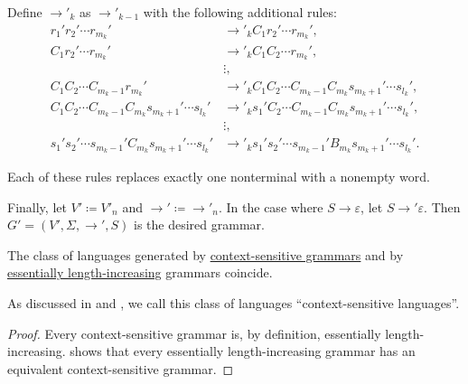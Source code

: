 \begin{algorithm}
\begin{thmenum}
    Define \( \to'_k \) as \( \to'_{k-1} \) with the following additional rules:
    \begin{align*}
      r_1' r_2' \cdots r_{m_k}'                                      &\to'_k C_1 r_2' \cdots r_{m_k}', \\
      C_1 r_2' \cdots r_{m_k}'                                       &\to'_k C_1 C_2 \cdots r_{m_k}', \\
                                                                     &\vdots, \\
      C_1 C_2 \cdots C_{m_k-1} r_{m_k}'                              &\to'_k C_1 C_2 \cdots C_{m_k-1} C_{m_k} s_{m_k+1}' \cdots s_{l_k}', \\
      C_1 C_2 \cdots C_{m_k-1} C_{m_k} s_{m_k+1}' \cdots s_{l_k}'    &\to'_k s_1' C_2 \cdots C_{m_k-1} C_{m_k} s_{m_k+1}' \cdots s_{l_k}', \\
                                                                     &\vdots, \\
      s_1' s_2' \cdots s_{m_k-1}' C_{m_k} s_{m_k+1}' \cdots s_{l_k}' &\to'_k s_1' s_2' \cdots s_{m_k-1}' B_{m_k} s_{m_k+1}' \cdots s_{l_k}'.
    \end{align*}

    Each of these rules replaces exactly one nonterminal with a nonempty word.

     Finally, let \( V' \coloneqq V'_n \) and \( {\to'} \coloneqq {\to'_n} \). In the case where \( S \to \varepsilon \), let \( S \to' \varepsilon \). Then \( G' = (V', \Sigma, \to', S) \) is the desired grammar.
  \end{thmenum}
\end{algorithm}

\begin{proposition}\label{thm:context_sensitive_languages}
  The class of languages generated by \hyperref[def:chomsky_hierarchy/context_sensitive]{context-sensitive grammars} and by \hyperref[def:length_increasing_grammar]{essentially length-increasing} grammars coincide.
\end{proposition}
\begin{comments}
  \item As discussed in  and , we call this class of languages \enquote{context-sensitive languages}.
\end{comments}
\begin{proof}
  Every context-sensitive grammar is, by definition, essentially length-increasing.  shows that every essentially length-increasing grammar has an equivalent context-sensitive grammar.
\end{proof}

